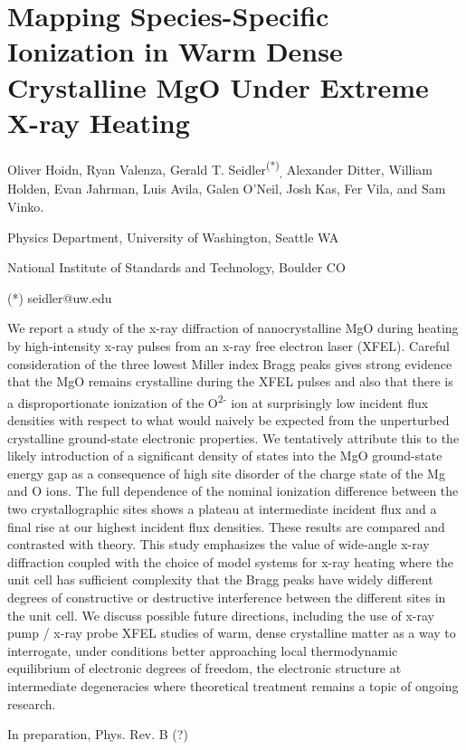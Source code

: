 \chapter{Mapping Species-Specific Ionization in Warm Dense Crystalline MgO Under Extreme X-ray Heating }
\label{mgo}

Oliver Hoidn, Ryan Valenza, Gerald T.
Seidler\textsuperscript{(*)}\textsubscript{,} Alexander Ditter, William
Holden, Evan Jahrman, Luis Avila, Galen O'Neil, Josh Kas, Fer Vila, and Sam Vinko.

Physics Department, University of Washington, Seattle WA

National Institute of Standards and Technology, Boulder CO

(*) seidler@uw.edu

We report a study of the x-ray diffraction of nanocrystalline MgO during
heating by high-intensity x-ray pulses from an x-ray free electron laser
(XFEL). Careful consideration of the three lowest Miller index Bragg
peaks gives strong evidence that the MgO remains crystalline during the
XFEL pulses and also that there is a disproportionate ionization of the
O\textsuperscript{2-} ion at surprisingly low incident flux densities
with respect to what would naively be expected from the unperturbed
crystalline ground-state electronic properties. We tentatively attribute
this to the likely introduction of a significant density of states into
the MgO ground-state energy gap as a consequence of high site disorder
of the charge state of the Mg and O ions. The full dependence of the
nominal ionization difference between the two crystallographic sites
shows a plateau at intermediate incident flux and a final rise at our
highest incident flux densities. These results are compared and
contrasted with theory.  This study emphasizes
the value of wide-angle x-ray diffraction coupled with the choice of
model systems for x-ray heating where the unit cell has sufficient
complexity that the Bragg peaks have widely different degrees of
constructive or destructive interference between the different sites in
the unit cell. We discuss possible future directions, including the use
of x-ray pump / x-ray probe XFEL studies of warm, dense crystalline
matter as a way to interrogate, under conditions better approaching
local thermodynamic equilibrium of electronic degrees of freedom, the
electronic structure at intermediate degeneracies where theoretical
treatment remains a topic of ongoing research.

In preparation, Phys. Rev. B (?) \textbf{\\}

